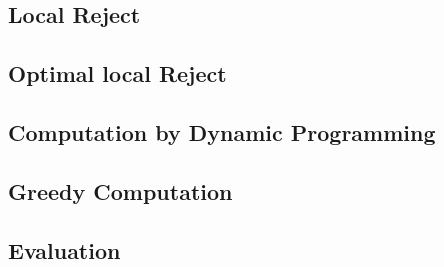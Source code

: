 \subsection{Local Reject}

\subsection{Optimal local Reject}

\subsection{Computation by Dynamic Programming}

\subsection{Greedy Computation}

\subsection{Evaluation}